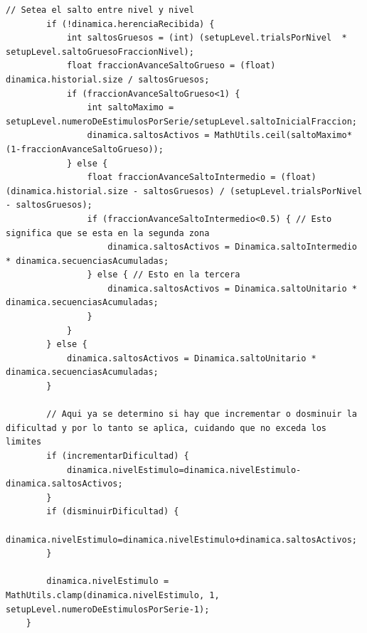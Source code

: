 \documentclass{article}
\numberwithin{figure}{section}
\begin{document}
\begin{lstlisting}[caption=Código que se ejecuta al recibir la información de una respuesta dada por el usuario]
		// Setea el salto entre nivel y nivel
		if (!dinamica.herenciaRecibida) {
			int saltosGruesos = (int) (setupLevel.trialsPorNivel  * setupLevel.saltoGruesoFraccionNivel);
			float fraccionAvanceSaltoGrueso = (float) dinamica.historial.size / saltosGruesos;
			if (fraccionAvanceSaltoGrueso<1) {
				int saltoMaximo = setupLevel.numeroDeEstimulosPorSerie/setupLevel.saltoInicialFraccion;
				dinamica.saltosActivos = MathUtils.ceil(saltoMaximo*(1-fraccionAvanceSaltoGrueso));
			} else { 
				float fraccionAvanceSaltoIntermedio = (float) (dinamica.historial.size - saltosGruesos) / (setupLevel.trialsPorNivel - saltosGruesos);
				if (fraccionAvanceSaltoIntermedio<0.5) { // Esto significa que se esta en la segunda zona
					dinamica.saltosActivos = Dinamica.saltoIntermedio * dinamica.secuenciasAcumuladas;
				} else { // Esto en la tercera
					dinamica.saltosActivos = Dinamica.saltoUnitario * dinamica.secuenciasAcumuladas;
				}
			}
		} else {
			dinamica.saltosActivos = Dinamica.saltoUnitario * dinamica.secuenciasAcumuladas;
		}
		
		// Aqui ya se determino si hay que incrementar o dosminuir la dificultad y por lo tanto se aplica, cuidando que no exceda los limites
		if (incrementarDificultad) {
			dinamica.nivelEstimulo=dinamica.nivelEstimulo-dinamica.saltosActivos;
		}
		if (disminuirDificultad) {
			dinamica.nivelEstimulo=dinamica.nivelEstimulo+dinamica.saltosActivos;
		}
			
		dinamica.nivelEstimulo = MathUtils.clamp(dinamica.nivelEstimulo, 1, setupLevel.numeroDeEstimulosPorSerie-1);
	}


 \end{lstlisting}
\end{document}
